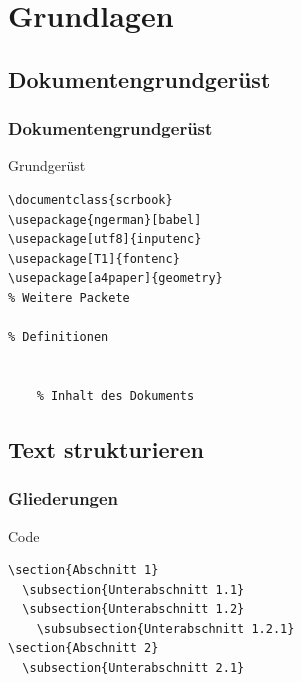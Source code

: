\section{Grundlagen}


\subsection{Dokumentengrundgerüst}

\begin{frame}[fragile]
	\frametitle{Dokumentengrundgerüst}

	\begin{block}{Grundgerüst}
		\begin{verbatim}
\documentclass{scrbook}
\usepackage{ngerman}[babel]
\usepackage[utf8]{inputenc}
\usepackage[T1]{fontenc}
\usepackage[a4paper]{geometry}
% Weitere Packete

% Definitionen


	% Inhalt des Dokuments

		\end{verbatim}
	\end{block}
\end{frame}



\subsection{Text strukturieren}

\begin{frame}[fragile]
	\frametitle{Gliederungen}

  \begin{block}{Code}
    \begin{verbatim}
\section{Abschnitt 1}
  \subsection{Unterabschnitt 1.1}
  \subsection{Unterabschnitt 1.2}
    \subsubsection{Unterabschnitt 1.2.1}
\section{Abschnitt 2}
  \subsection{Unterabschnitt 2.1}
    \end{verbatim}
  \end{block}
\end{frame}


